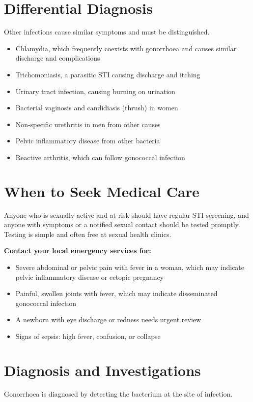 \section*{Differential Diagnosis}
Other infections cause similar symptoms and must be distinguished.

\begin{itemize}
    \item Chlamydia, which frequently coexists with gonorrhoea and causes similar discharge and complications
    \item Trichomoniasis, a parasitic STI causing discharge and itching
    \item Urinary tract infection, causing burning on urination
    \item Bacterial vaginosis and candidiasis (thrush) in women
    \item Non-specific urethritis in men from other causes
    \item Pelvic inflammatory disease from other bacteria
    \item Reactive arthritis, which can follow gonococcal infection
\end{itemize}

\section*{When to Seek Medical Care}
Anyone who is sexually active and at risk should have regular STI screening, and anyone with symptoms or a notified sexual contact should be tested promptly. Testing is simple and often free at sexual health clinics.

\textbf{Contact your local emergency services for:}
\begin{itemize}
    \item Severe abdominal or pelvic pain with fever in a woman, which may indicate pelvic inflammatory disease or ectopic pregnancy
    \item Painful, swollen joints with fever, which may indicate disseminated gonococcal infection
    \item A newborn with eye discharge or redness needs urgent review
    \item Signs of sepsis: high fever, confusion, or collapse
\end{itemize}

\section*{Diagnosis and Investigations}
Gonorrhoea is diagnosed by detecting the bacterium at the site of infection.

